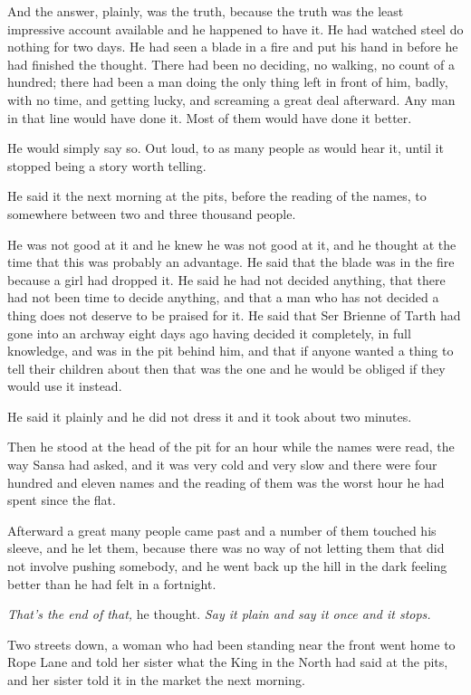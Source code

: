 And the answer, plainly, was the truth, because the truth was the least impressive account available and he happened to have it. He had watched steel do nothing for two days. He had seen a blade in a fire and put his hand in before he had finished the thought. There had been no deciding, no walking, no count of a hundred; there had been a man doing the only thing left in front of him, badly, with no time, and getting lucky, and screaming a great deal afterward. Any man in that line would have done it. Most of them would have done it better.

He would simply say so. Out loud, to as many people as would hear it, until it stopped being a story worth telling.

\sceneBreak

He said it the next morning at the pits, before the reading of the names, to somewhere between two and three thousand people.

He was not good at it and he knew he was not good at it, and he thought at the time that this was probably an advantage. He said that the blade was in the fire because a girl had dropped it. He said he had not decided anything, that there had not been time to decide anything, and that a man who has not decided a thing does not deserve to be praised for it. He said that Ser Brienne of Tarth had gone into an archway eight days ago having decided it completely, in full knowledge, and was in the pit behind him, and that if anyone wanted a thing to tell their children about then that was the one and he would be obliged if they would use it instead.

He said it plainly and he did not dress it and it took about two minutes.

Then he stood at the head of the pit for an hour while the names were read, the way Sansa had asked, and it was very cold and very slow and there were four hundred and eleven names and the reading of them was the worst hour he had spent since the flat.

Afterward a great many people came past and a number of them touched his sleeve, and he let them, because there was no way of not letting them that did not involve pushing somebody, and he went back up the hill in the dark feeling better than he had felt in a fortnight.

\textit{That’s the end of that,} he thought. \textit{Say it plain and say it once and it stops.}

\sceneBreak

Two streets down, a woman who had been standing near the front went home to Rope Lane and told her sister what the King in the North had said at the pits, and her sister told it in the market the next morning.

